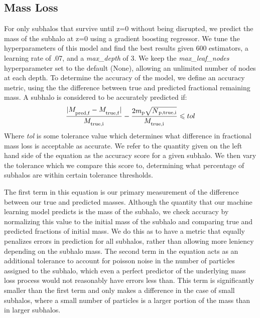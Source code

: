 \documentclass[fleqn,usenatbib]{mnras}
\begin{document}
\subsection{Mass Loss}
\label{sec:mass loss}
For only subhalos that survive until z=0 without being disrupted, we predict the mass of the subhalo at z=0 using a gradient boosting regressor. We tune the hyperparameters of this model and find the best results given 600 estimators, a learning rate of .07, and a \textit{max\_depth} of 3. We keep the \textit{max\_leaf\_nodes} hyperparameter set to the default (None), allowing an unlimited number of nodes at each depth. To determine the accuracy of the model, we define an accuracy metric, using the the difference between true and predicted fractional remaining mass. A subhalo is considered to be accurately predicted if:
\begin{equation}
    \label{eq:mass loss}
    \frac{|M_\textsubscript{pred,f} - M_\textsubscript{true,f}|}{M_\textsubscript{true,i}} - \frac{2m\textsubscript{p}\sqrt{N\textsubscript{p,true,i}}}{M_\textsubscript{true,i}} \leq tol
\end{equation}
Where \textit{tol} is some tolerance value which determines what difference in fractional mass loss is acceptable as accurate. We refer to the quantity given on the left hand side of the equation as the accuracy score for a given subhalo. We then vary the tolerance which we compare this score to, determining what percentage of subhalos are within certain tolerance thresholds. 

The first term in this equation is our primary measurement of the difference between our true and predicted masses. Although the quantity that our machine learning model predicts is the mass of the subhalo, we check accuracy by normalizing this value to the initial mass of the subhalo and comparing true and predicted fractions of initial mass. We do this as to have a metric that equally penalizes errors in prediction for all subhalos, rather than allowing more leniency depending on the subhalo mass. The second term in the equation acts as an additional tolerance to account for poisson noise in the number of particles assigned to the subhalo, which even a perfect predictor of the underlying mass loss process would not reasonably have errors less than. This term is significantly smaller than the first term and only makes a difference in the case of small subhalos, where a small number of particles is a larger portion of the mass than in larger subhalos.
\end{document}
